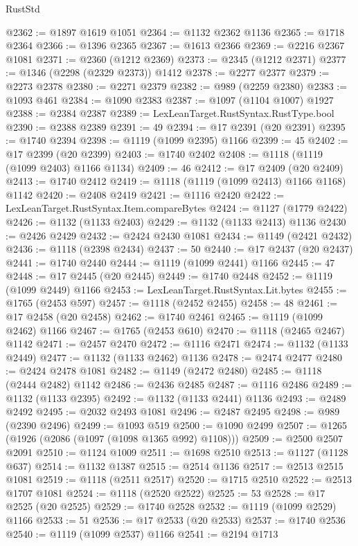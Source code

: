 \begin{lexlean}{RustStd}
\begin{coremodule}
@2362 := @1897 @1619 @1051
@2364 := @1132 @2362 @1136
@2365 := @1718 @2364
@2366 := @1396 @2365
@2367 := @1613 @2366
@2369 := @2216 @2367 @1081
@2371 := @2360 (@1212 @2369)
@2373 := @2345 (@1212 @2371)
@2377 := @1346 (@2298 (@2329 @2373)) @1412
@2378 := @2277 @2377
@2379 := @2273 @2378
@2380 := @2271 @2379
@2382 := @989 (@2259 @2380)
@2383 := @1093 @461
@2384 := @1090 @2383
@2387 := @1097 (@1104 @1007) @1927
@2388 := @2384 @2387
@2389 := LexLeanTarget.RustSyntax.RustType.bool
@2390 := @2388 @2389
@2391 := 49
@2394 := @17 @2391 (@20 @2391)
@2395 := @1740 @2394
@2398 := @1119 (@1099 @2395) @1166
@2399 := 45
@2402 := @17 @2399 (@20 @2399)
@2403 := @1740 @2402
@2408 := @1118 (@1119 (@1099 @2403) @1166 @1134)
@2409 := 46
@2412 := @17 @2409 (@20 @2409)
@2413 := @1740 @2412
@2419 := @1118 (@1119 (@1099 @2413) @1166 @1168) @1142
@2420 := @2408 @2419
@2421 := @1116 @2420
@2422 := LexLeanTarget.RustSyntax.Item.compareBytes
@2424 := @1127 (@1779 @2422)
@2426 := @1132 (@1133 @2403)
@2429 := @1132 (@1133 @2413) @1136
@2430 := @2426 @2429
@2432 := @2424 @2430 @1081
@2434 := @1149 (@2421 @2432)
@2436 := @1118 (@2398 @2434)
@2437 := 50
@2440 := @17 @2437 (@20 @2437)
@2441 := @1740 @2440
@2444 := @1119 (@1099 @2441) @1166
@2445 := 47
@2448 := @17 @2445 (@20 @2445)
@2449 := @1740 @2448
@2452 := @1119 (@1099 @2449) @1166
@2453 := LexLeanTarget.RustSyntax.Lit.bytes
@2455 := @1765 (@2453 @597)
@2457 := @1118 (@2452 @2455)
@2458 := 48
@2461 := @17 @2458 (@20 @2458)
@2462 := @1740 @2461
@2465 := @1119 (@1099 @2462) @1166
@2467 := @1765 (@2453 @610)
@2470 := @1118 (@2465 @2467) @1142
@2471 := @2457 @2470
@2472 := @1116 @2471
@2474 := @1132 (@1133 @2449)
@2477 := @1132 (@1133 @2462) @1136
@2478 := @2474 @2477
@2480 := @2424 @2478 @1081
@2482 := @1149 (@2472 @2480)
@2485 := @1118 (@2444 @2482) @1142
@2486 := @2436 @2485
@2487 := @1116 @2486
@2489 := @1132 (@1133 @2395)
@2492 := @1132 (@1133 @2441) @1136
@2493 := @2489 @2492
@2495 := @2032 @2493 @1081
@2496 := @2487 @2495
@2498 := @989 (@2390 @2496)
@2499 := @1093 @519
@2500 := @1090 @2499
@2507 := @1265 (@1926 (@2086 (@1097 (@1098 @1365 @992) @1108)))
@2509 := @2500 @2507 @2091
@2510 := @1124 @1009
@2511 := @1698 @2510
@2513 := @1127 (@1128 @637)
@2514 := @1132 @1387
@2515 := @2514 @1136
@2517 := @2513 @2515 @1081
@2519 := @1118 (@2511 @2517)
@2520 := @1715 @2510
@2522 := @2513 @1707 @1081
@2524 := @1118 (@2520 @2522)
@2525 := 53
@2528 := @17 @2525 (@20 @2525)
@2529 := @1740 @2528
@2532 := @1119 (@1099 @2529) @1166
@2533 := 51
@2536 := @17 @2533 (@20 @2533)
@2537 := @1740 @2536
@2540 := @1119 (@1099 @2537) @1166
@2541 := @2194 @1713

\end{coremodule}
\end{lexlean}
